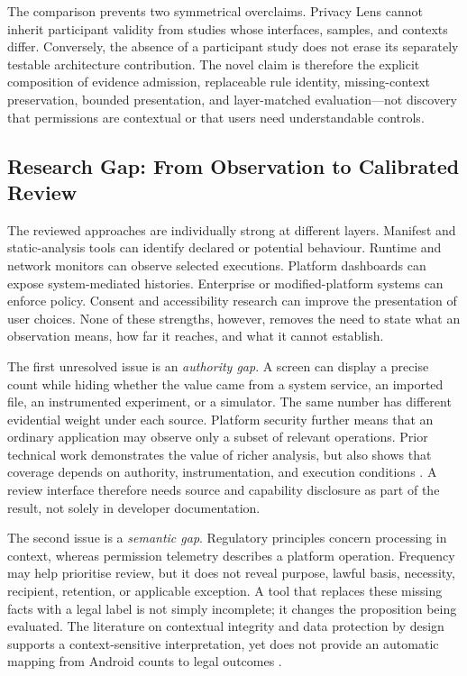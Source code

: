 The comparison prevents two symmetrical overclaims. Privacy Lens cannot inherit participant validity from studies whose interfaces, samples, and contexts differ. Conversely, the absence of a participant study does not erase its separately testable architecture contribution. The novel claim is therefore the explicit composition of evidence admission, replaceable rule identity, missing-context preservation, bounded presentation, and layer-matched evaluation---not discovery that permissions are contextual or that users need understandable controls.

\subsection{Research Gap: From Observation to Calibrated Review}

The reviewed approaches are individually strong at different layers. Manifest and static-analysis tools can identify declared or potential behaviour. Runtime and network monitors can observe selected executions. Platform dashboards can expose system-mediated histories. Enterprise or modified-platform systems can enforce policy. Consent and accessibility research can improve the presentation of user choices. None of these strengths, however, removes the need to state what an observation means, how far it reaches, and what it cannot establish.

The first unresolved issue is an \emph{authority gap}. A screen can display a precise count while hiding whether the value came from a system service, an imported file, an instrumented experiment, or a simulator. The same number has different evidential weight under each source. Platform security further means that an ordinary application may observe only a subset of relevant operations. Prior technical work demonstrates the value of richer analysis, but also shows that coverage depends on authority, instrumentation, and execution conditions \cite{49,androidpermissions2026}. A review interface therefore needs source and capability disclosure as part of the result, not solely in developer documentation.

The second issue is a \emph{semantic gap}. Regulatory principles concern processing in context, whereas permission telemetry describes a platform operation. Frequency may help prioritise review, but it does not reveal purpose, lawful basis, necessity, recipient, retention, or applicable exception. A tool that replaces these missing facts with a legal label is not simply incomplete; it changes the proposition being evaluated. The literature on contextual integrity and data protection by design supports a context-sensitive interpretation, yet does not provide an automatic mapping from Android counts to legal outcomes \cite{5,eurlex2016,edpb2019}.


